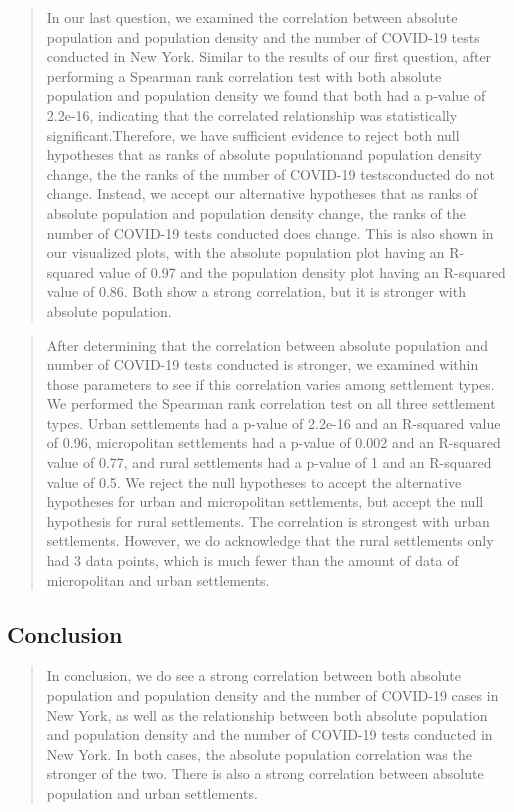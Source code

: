 \documentclass[
  12pt,
]{article}
\begin{document}
\begin{quote}
In our last question, we examined the correlation between absolute
population and population density and the number of COVID-19 tests
conducted in New York. Similar to the results of our first question,
after performing a Spearman rank correlation test with both absolute
population and population density we found that both had a p-value of
2.2e-16, indicating that the correlated relationship was statistically
significant.Therefore, we have sufficient evidence to reject both null
hypotheses that as ranks of absolute populationand population density
change, the the ranks of the number of COVID-19 testsconducted do not
change. Instead, we accept our alternative hypotheses that as ranks of
absolute population and population density change, the ranks of the
number of COVID-19 tests conducted does change. This is also shown in
our visualized plots, with the absolute population plot having an
R-squared value of 0.97 and the population density plot having an
R-squared value of 0.86. Both show a strong correlation, but it is
stronger with absolute population.
\end{quote}

\begin{quote}
After determining that the correlation between absolute population and
number of COVID-19 tests conducted is stronger, we examined within those
parameters to see if this correlation varies among settlement types. We
performed the Spearman rank correlation test on all three settlement
types. Urban settlements had a p-value of 2.2e-16 and an R-squared value
of 0.96, micropolitan settlements had a p-value of 0.002 and an
R-squared value of 0.77, and rural settlements had a p-value of 1 and an
R-squared value of 0.5. We reject the null hypotheses to accept the
alternative hypotheses for urban and micropolitan settlements, but
accept the null hypothesis for rural settlements. The correlation is
strongest with urban settlements. However, we do acknowledge that the
rural settlements only had 3 data points, which is much fewer than the
amount of data of micropolitan and urban settlements.
\end{quote}

\hypertarget{conclusion}{%
\subsection{Conclusion}\label{conclusion}}

\begin{quote}
In conclusion, we do see a strong correlation between both absolute
population and population density and the number of COVID-19 cases in
New York, as well as the relationship between both absolute population
and population density and the number of COVID-19 tests conducted in New
York. In both cases, the absolute population correlation was the
stronger of the two. There is also a strong correlation between absolute
population and urban settlements.
\end{quote}
\end{document}
